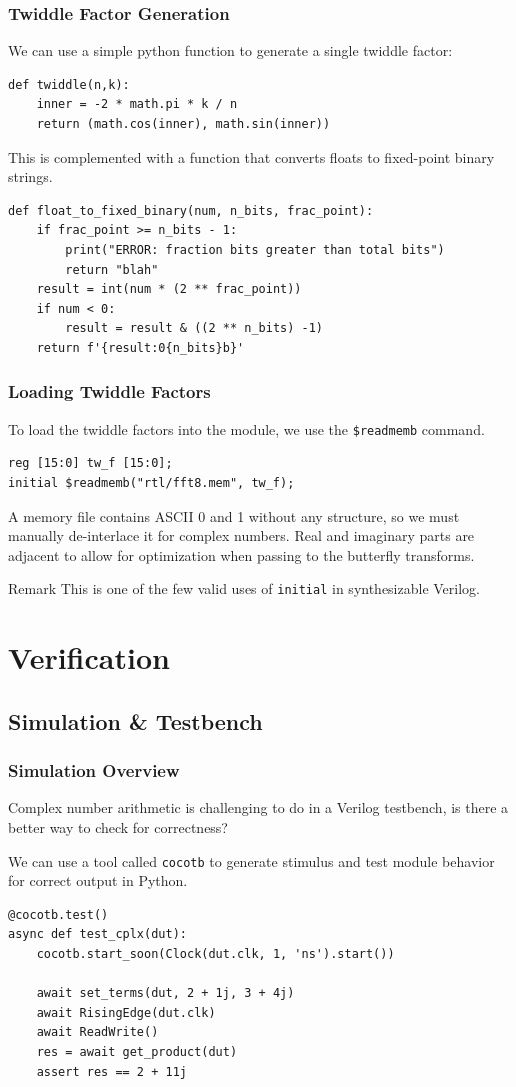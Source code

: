 \documentclass{beamer}
\begin{document}
\begin{frame}[fragile]
	\frametitle{Twiddle Factor Generation}
	We can use a simple python function to generate a single twiddle factor:
\begin{verbatim}
def twiddle(n,k):
    inner = -2 * math.pi * k / n
    return (math.cos(inner), math.sin(inner))
\end{verbatim}
This is complemented with a function that converts floats to fixed-point binary strings.
\begin{verbatim}
def float_to_fixed_binary(num, n_bits, frac_point):
    if frac_point >= n_bits - 1:
        print("ERROR: fraction bits greater than total bits")
        return "blah"
    result = int(num * (2 ** frac_point))
    if num < 0:
        result = result & ((2 ** n_bits) -1)
    return f'{result:0{n_bits}b}'
\end{verbatim}
\end{frame}

\begin{frame}[fragile]
	\frametitle{Loading Twiddle Factors}
	To load the twiddle factors into the module, we use the \texttt{\$readmemb}
	command.
\begin{verbatim}
reg [15:0] tw_f [15:0];
initial $readmemb("rtl/fft8.mem", tw_f);
\end{verbatim}
\pause
A memory file contains ASCII 0 and 1 without any structure, so we must manually
de-interlace it for complex numbers. Real and imaginary parts are adjacent to
allow for optimization when passing to the butterfly transforms.

\pause
\begin{block}{Remark}
	This is one of the few valid uses of \texttt{initial} in synthesizable
	Verilog.
\end{block}
\end{frame}

\section{Verification}

\subsection{Simulation \& Testbench}
\begin{frame}[fragile]
	\frametitle{Simulation Overview}
	Complex number arithmetic is challenging to do in a Verilog testbench,
	is there a better way to check for correctness?

	\pause
	 We can use a tool called \texttt{cocotb} to generate stimulus and
	test module behavior for correct output in Python.

\begin{verbatim}
@cocotb.test()
async def test_cplx(dut):
    cocotb.start_soon(Clock(dut.clk, 1, 'ns').start())

    await set_terms(dut, 2 + 1j, 3 + 4j)
    await RisingEdge(dut.clk)
    await ReadWrite()
    res = await get_product(dut)
    assert res == 2 + 11j
\end{verbatim}
\end{frame}
\end{document}

